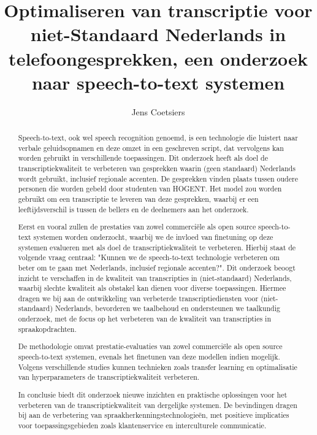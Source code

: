 \documentclass{hogent-article}
\title{Optimaliseren van transcriptie voor niet-Standaard Nederlands in telefoongesprekken, een onderzoek naar speech-to-text systemen}
\author{Jens Coetsiers}
\begin{document}
\begin{abstract}
Speech-to-text, ook wel speech recognition genoemd, is een technologie die luistert naar verbale geluidsopnamen en deze omzet in een geschreven script, dat vervolgens kan worden gebruikt in verschillende toepassingen. Dit onderzoek heeft als doel de transcriptiekwaliteit te verbeteren van gesprekken waarin (geen standaard) Nederlands wordt gebruikt, inclusief regionale accenten. De gesprekken vinden plaats tussen oudere personen die worden gebeld door studenten van HOGENT. Het model zou worden gebruikt om een transcriptie te leveren van deze gesprekken, waarbij er een leeftijdsverschil is tussen de bellers en de deelnemers aan het onderzoek.

Eerst en vooral zullen de prestaties van zowel commerciële als open source speech-to-text systemen worden onderzocht, waarbij we de invloed van finetuning op deze systemen evalueren met als doel de transcriptiekwaliteit te verbeteren. Hierbij staat de volgende vraag centraal: "Kunnen we de speech-to-text technologie verbeteren om beter om te gaan met Nederlands, inclusief regionale accenten?". Dit onderzoek beoogt inzicht te verschaffen in de kwaliteit van transcripties in (niet-standaard) Nederlands, waarbij slechte kwaliteit als obstakel kan dienen voor diverse toepassingen. Hiermee dragen we bij aan de ontwikkeling van verbeterde transcriptiediensten voor (niet-standaard) Nederlands, bevorderen we taalbehoud en ondersteunen we taalkundig onderzoek, met de focus op het verbeteren van de kwaliteit van transcripties in spraakopdrachten.

De methodologie omvat prestatie-evaluaties van zowel commerciële als open source speech-to-text systemen, evenals het finetunen van deze modellen indien mogelijk. Volgens verschillende studies kunnen technieken zoals transfer learning en optimalisatie van hyperparameters de transcriptiekwaliteit verbeteren.

In conclusie biedt dit onderzoek nieuwe inzichten en praktische oplossingen voor het verbeteren van de transcriptiekwaliteit van dergelijke systemen. De bevindingen dragen bij aan de verbetering van spraakherkenningstechnologieën, met positieve implicaties voor toepassingsgebieden zoals klantenservice en interculturele communicatie.
\end{abstract}

\tableofcontents



\printbibliography[heading=bibintoc]
\end{document}
